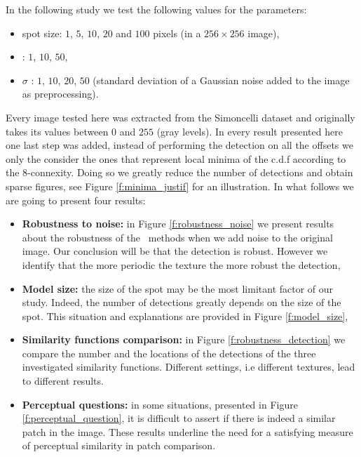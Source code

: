 In the following study we test the following values for the parameters:
\begin{itemize}
\item spot size: $1$, $5$, $10$, $20$ and $100$ pixels (in a $256 \times 256$ image),
\item \NFA : $1$, $10$, $50$,
\item $\sigma$ : $1$, $10$, $20$, $50$ (standard deviation of a Gaussian noise added to the image as preprocessing).
\end{itemize}
Every image tested here was extracted from the Simoncelli dataset and originally takes its values between $0$ and $255$ (gray levels). In every result presented here one last step was added, instead of performing the detection on all the offsets we only the consider the ones that represent local minima of the c.d.f according to the 8-connexity. Doing so we greatly reduce the number of detections and obtain sparse figures, see Figure \ref{f:minima_justif} for an illustration. In what follows we are going to present four results:
\begin{itemize}
\item \textbf{Robustness to noise:} in Figure \ref{f:robustness_noise} we present results about the robustness of the \acontrario \ methods when we add noise to the original image. Our conclusion will be that the detection is robust. However we identify that the more periodic the texture the more robust the detection,
\item \textbf{Model size:} the size of the spot may be the most limitant factor of our study. Indeed, the number of detections greatly depends on the size of the spot. This situation and explanations are provided in Figure \ref{f:model_size},
\item \textbf{Similarity functions comparison:} in Figure \ref{f:robustness_detection} we compare the number and the locations of the detections of the three investigated similarity functions. Different settings, i.e different textures, lead to different results.
\item \textbf{Perceptual questions:} in some situations, presented in Figure \ref{f:perceptual_question}, it is difficult to assert if there is indeed a similar patch in the image. These results underline the need for a satisfying measure of perceptual similarity in patch comparison.
\end{itemize}
